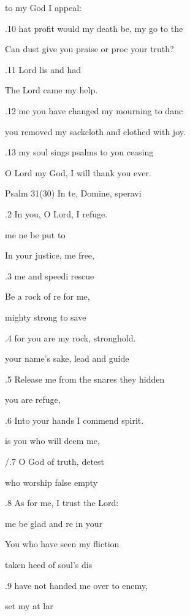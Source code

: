 to my God I  appeal: 

.10 hat profit would my death be, my go to the  

Can dust give you praise or proc your truth? 

.11  Lord lis and had  

The Lord came  my help. 

.12  me you have changed my mourning to danc 

you removed my sackcloth and clothed  with joy. 

.13  my soul sings psalms to you ceasing 

O Lord my God, I will thank you  ever. 

Psalm 31(30) In te, Domine, speravi 


.2 In you, O Lord, I  refuge. 

 me ne be put to  

In your justice,  me free, 

.3  me and speedi rescue  

Be a rock of re for me, 

 mighty strong to save  

.4 for you are my rock,  stronghold. 

 your name's sake, lead  and guide  

.5 Release me from the snares they  hidden 

 you are  refuge,  

.6 Into your hands I commend  spirit. 

 is you who will deem me,  

/.7 O God of truth,  detest 

 who worship false  empty  

.8 As for me, I trust  the Lord: 

 me be glad and re in your  

You who have seen my fliction 

 taken heed of  soul's dis 

.9 have not handed me over to  enemy, 

 set my  at lar 

